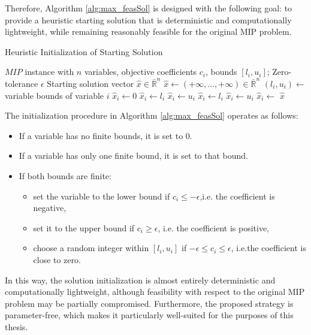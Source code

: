 Therefore, Algorithm \ref{alg:max_feasSol} is designed with the following goal: to provide a heuristic starting solution that is deterministic and computationally lightweight, while remaining reasonably feasible for the original MIP problem.  
\begin{algorithm}[H]
\caption{Heuristic Initialization of Starting Solution}\label{alg:max_feasSol}
\begin{algorithmic}[1]
\Require $MIP$ instance with $n$ variables, objective coefficients $c_i$, bounds $[l_i, u_i]$; Zero-tolerance $\epsilon$
\Ensure Starting solution vector $\hat{x} \in \bar{\mathbb{R}}^n$
    \State $\hat{x} \gets ( +\infty, \ldots, +\infty ) \in \bar{\mathbb{R}}^n$
        \State $(l_i, u_i) \gets$ variable bounds of variable $i$
            \State $\hat{x}_i \gets 0$
            \State $\hat{x}_i \gets l_i$
            \State $\hat{x}_i \gets u_i$
        \Else
                \State $\hat{x}_i \gets l_i$
                \State $\hat{x}_i \gets u_i$
            \Else
                \State $\hat{x}_i \gets$ 
            \EndIf
        \EndIf
    \EndFor
    \State \Return $\hat{x}$
\EndFunction
\end{algorithmic}
\end{algorithm}
The initialization procedure in Algorithm \ref{alg:max_feasSol} operates as follows:
\begin{itemize}
    \item If a variable has no finite bounds, it is set to $0$.
    \item If a variable has only one finite bound, it is set to that bound.
    \item If both bounds are finite:
    \begin{itemize}
        \item set the variable to the lower bound if $c_i \leq -\epsilon$,i.e. the coefficient is negative,
        \item set it to the upper bound if $c_i \geq \epsilon$, i.e. the coefficient is positive,
        \item choose a random integer within $[l_i, u_i]$ if $-\epsilon \leq c_i \leq \epsilon$, i.e.the coefficient is close to zero.
    \end{itemize}
\end{itemize}
In this way, the solution initialization is almost entirely deterministic and computationally lightweight, although feasibility with respect to the original MIP problem may be partially compromised. Furthermore, the proposed strategy is parameter-free, which makes it particularly well-suited for the purposes of this thesis.

